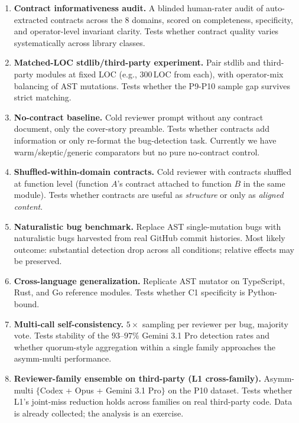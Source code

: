 \begin{enumerate}[leftmargin=2em]
\item \textbf{Contract informativeness audit.} A blinded human-rater audit of auto-extracted contracts across the $8$ domains, scored on completeness, specificity, and operator-level invariant clarity. Tests whether contract quality varies systematically across library classes.

\item \textbf{Matched-LOC stdlib/third-party experiment.} Pair stdlib and third-party modules at fixed LOC (e.g., $300\,\mathrm{LOC}$ from each), with operator-mix balancing of AST mutations. Tests whether the P9-P10 sample gap survives strict matching.

\item \textbf{No-contract baseline.} Cold reviewer prompt without any contract document, only the cover-story preamble. Tests whether contracts add information or only re-format the bug-detection task. Currently we have warm/skeptic/generic comparators but no pure no-contract control.

\item \textbf{Shuffled-within-domain contracts.} Cold reviewer with contracts shuffled at function level (function $A$'s contract attached to function $B$ in the same module). Tests whether contracts are useful as \emph{structure} or only as \emph{aligned content}.

\item \textbf{Naturalistic bug benchmark.} Replace AST single-mutation bugs with naturalistic bugs harvested from real GitHub commit histories. Most likely outcome: substantial detection drop across all conditions; relative effects may be preserved.

\item \textbf{Cross-language generalization.} Replicate AST mutator on TypeScript, Rust, and Go reference modules. Tests whether C1 specificity is Python-bound.

\item \textbf{Multi-call self-consistency.} $5\times$ sampling per reviewer per bug, majority vote. Tests stability of the $93$--$97\%$ Gemini 3.1 Pro detection rates and whether quorum-style aggregation within a single family approaches the asymm-multi performance.

\item \textbf{Reviewer-family ensemble on third-party (L1 cross-family).} Asymm-multi $\{$Codex + Opus + Gemini 3.1 Pro$\}$ on the P10 dataset. Tests whether L1's joint-miss reduction holds across families on real third-party code. Data is already collected; the analysis is an exercise.


\end{enumerate}
